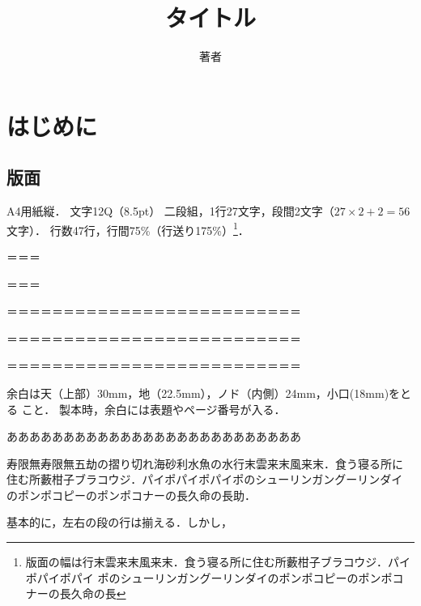 \documentclass[a4j, 12Q, twocolumn, twoside]{jsarticle}
\title{タイトル}
\author{著者}
\date{}
\begin{document}
\section{はじめに}
\subsection{版面}
A4用紙縦．
文字12Q（8.5pt）
二段組，1行27文字，段間2文字（$27 \times 2 + 2 = 56$文字）．
行数47行，行間75\%（行送り175\%）\footnote{版面の幅は行末雲来末風来末．食う寝る所に住む所藪柑子ブラコウジ．パイポパイポパイ
ポのシューリンガングーリンダイのポンポコピーのポンポコナーの長久命の長
}．

＝＝＝


＝＝＝


＝＝＝＝＝＝＝＝＝＝＝＝＝＝＝＝＝＝＝＝＝＝＝＝＝＝


＝＝＝＝＝＝＝＝＝＝＝＝＝＝＝＝＝＝＝＝＝＝＝＝＝＝


＝＝＝＝＝＝＝＝＝＝＝＝＝＝＝＝＝＝＝＝＝＝＝＝＝＝

余白は天（上部）30mm，地（22.5mm），ノド（内側）24mm，小口(18mm)をとる
こと．
製本時，余白には表題やページ番号が入る．

 {\Large ああああああああああああああああああああああああああ}

寿限無寿限無五劫の摺り切れ海砂利水魚の水行末雲来末風来末．食う寝る所に
住む所藪柑子ブラコウジ．パイポパイポパイポのシューリンガングーリンダイ
のポンポコピーのポンポコナーの長久命の長助．

基本的に，左右の段の行は揃える．しかし，

\end{document}
